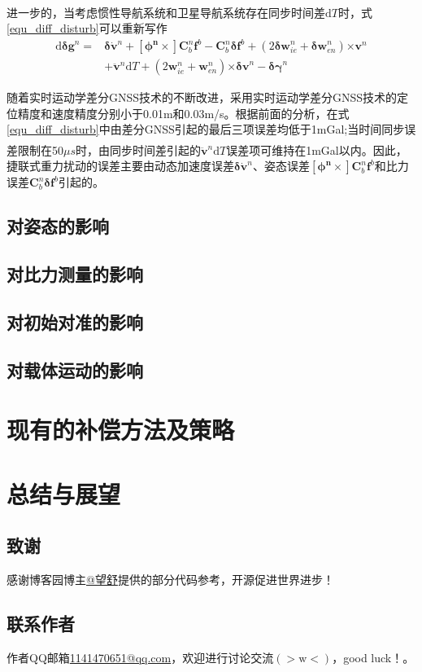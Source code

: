 \documentclass[12pt,a4,utf8]{article}
\newcommand{\upcite}[1]{\textsuperscript{\textsuperscript{\cite{#1}}}} %
\begin{document}
进一步的，当考虑惯性导航系统和卫星导航系统存在同步时间差$\text{d}T$时\upcite{schwarz1995some}，式\ref{equ_diff_disturb}可以重新写作
\begin{equation}
      \begin{aligned}
      \text{d}\bm{\delta g}^n = &\bm{\delta} \dot{\bm{v}}^n + \bm{[\phi^n\times]}\bm{C}^n_b \bm{f}^b - \bm{C}^n_b \bm{\delta f}^b + (2\bm{\delta w}^n_{ie} + \bm{\delta w}^n_{en})\bm{\times v}^n
      \\
      &+\ddot{\bm{v}}^n\text{d}T+(2\bm{w}^n_{ie} + \bm{w}^n_{en})\bm{\times \delta v}^n - \bm{\delta \gamma}^n
      \end{aligned}
      \label{equ_diff_disturb_more}
\end{equation}

随着实时运动学差分GNSS技术的不断改进，采用实时运动学差分GNSS技术的定位精度和速度精度分别小于0.01m和0.03m/s。根据前面的分析，在式\ref{equ_diff_disturb}中由差分GNSS引起的最后三项误差均低于1mGal;当时间同步误差限制在50$\mu s$时，由同步时间差引起的$\ddot{\bm{v}}^n\text{d}T$误差项可维持在1mGal以内\upcite{hao2024methods}。因此，捷联式重力扰动的误差主要由动态加速度误差$\bm{\delta} \dot{\bm{v}}^n$、姿态误差$\bm{[\phi^n\times]}\bm{C}^n_b \bm{f}^b$和比力误差$\bm{C}^n_b \bm{\delta f}^b$引起的。

\subsection{对姿态的影响}


\subsection{对比力测量的影响}


\subsection{对初始对准的影响}


\subsection{对载体运动的影响}

\section{现有的补偿方法及策略}

\section{总结与展望}


\newpage
\subsection{致谢}
感谢博客园博主\href{https://www.cnblogs.com/huangliu1111/p/13625826.html}{@望舒}提供的部分代码参考，开源促进世界进步！
\subsection{联系作者}
作者QQ邮箱\href{https://wx.mail.qq.com/?cancel_login=true&from=get_ticket_fail}{1141470651@qq.com}，欢迎进行讨论交流$(>\text{w}<)$，good luck！。


\end{document}
